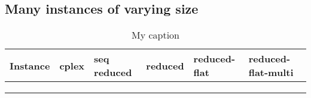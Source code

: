 

\subsection{Many instances of varying size}
\begin{table}[H]
	\centering
	\caption{My caption}
	\label{my-label}
	\begin{tabular}{|l|l|l|l|l|l|}\hline
		Instance & cplex & seq reduced & reduced & reduced-flat & reduced-flat-multi \\\hline
		&       &             &         &              &                    \\\hline
		&       &             &         &              &                    \\\hline
		&       &             &         &              &                   \\\hline
	\end{tabular}
\end{table}


